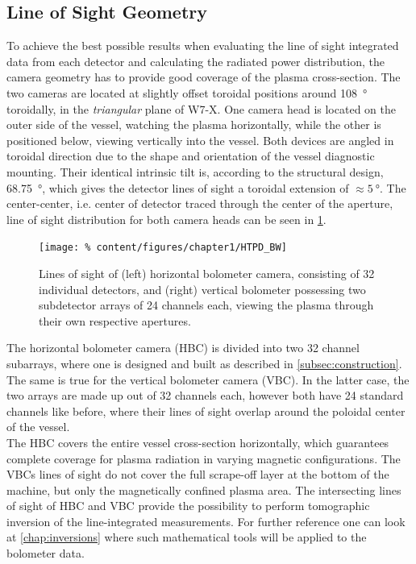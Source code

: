         \subsection{Line of Sight Geometry}\label{subsec:losgeometry}
%
            To achieve the best possible results when evaluating the line of sight integrated data from each detector and calculating the radiated power distribution, the camera geometry has to provide good coverage of the plasma cross-section. The two cameras are located at slightly offset toroidal positions around \SI{108}{\degree} toroidally, in the \textit{triangular} plane of W7-X. One camera head is located on the outer side of the vessel, watching the plasma horizontally, while the other is positioned below, viewing vertically into the vessel. Both devices are angled in toroidal direction due to the shape and orientation of the vessel diagnostic mounting. Their identical intrinsic tilt is, according to the structural design, \SI{68.75}{\degree}, which gives the detector lines of sight a toroidal extension of $\approx\SI{5}{\degree}$. The center-center, i.e. center of detector traced through the center of the aperture, line of sight distribution for both camera heads can be seen in \cref{fig:los_vessel}.\\%
%
            \begin{figure}[t]%
                \centering%
                \texttt{[image: \%
                    content/figures/chapter1/HTPD\_BW]}%
                \caption{Lines of sight of (left) horizontal bolometer camera, consisting of 32 individual detectors, and (right) vertical bolometer possessing two subdetector arrays of 24 channels each, viewing the plasma through their own respective apertures.}\label{fig:los_vessel}%
            \end{figure}%
%
            The horizontal bolometer camera (HBC) is divided into two 32 channel subarrays, where one is designed and built as described in \cref{subsec:construction}. The same is true for the vertical bolometer camera (VBC). In the latter case, the two arrays are made up out of 32 channels each, however both have 24 standard channels like before, where their lines of sight overlap around the poloidal center of the vessel.\\%
            The HBC covers the entire vessel cross-section horizontally, which guarantees complete coverage for plasma radiation in varying magnetic configurations. The VBCs lines of sight do not cover the full scrape-off layer at the bottom of the machine, but only the magnetically confined plasma area. The intersecting lines of sight of HBC and VBC provide the possibility to perform tomographic inversion of the line-integrated measurements. For further reference one can look at \cref{chap:inversions} where such mathematical tools will be applied to the bolometer data.\\%
